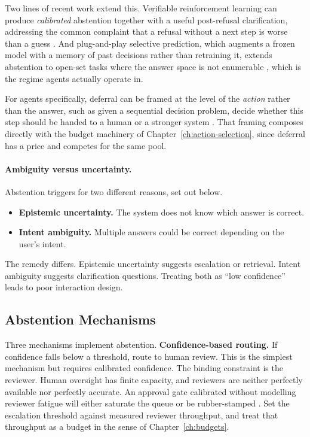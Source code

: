 Two lines of recent work extend this. Verifiable reinforcement learning can produce
\emph{calibrated} abstention together with a useful post-refusal clarification,
addressing the common complaint that a refusal without a next step is worse than a
guess \cite{abstainr12026}. And plug-and-play selective prediction, which augments
a frozen model with a memory of past decisions rather than retraining it, extends
abstention to open-set tasks where the answer space is not enumerable
\cite{selectivepred2026}, which is the regime agents actually operate in.

For agents specifically, deferral can be framed at the level of the \emph{action}
rather than the answer, such as given a sequential decision problem, decide whether this
step should be handed to a human or a stronger system \cite{redact2026}. That
framing composes directly with the budget machinery of
Chapter~\ref{ch:action-selection}, since deferral has a price and competes for the
same pool.

\paragraph{Ambiguity versus uncertainty.}
Abstention triggers for two different reasons, set out below.
\begin{itemize}
\item \textbf{Epistemic uncertainty.} The system does not know which answer is correct.
\item \textbf{Intent ambiguity.} Multiple answers could be correct depending on the user's intent.
\end{itemize}
The remedy differs. Epistemic uncertainty suggests escalation or retrieval. Intent ambiguity suggests clarification questions. Treating both as ``low confidence'' leads to poor interaction design.

\subsection{Abstention Mechanisms}

Three mechanisms implement abstention. \textbf{Confidence-based routing.} If confidence falls below a threshold, route to human review. This is the simplest mechanism but requires calibrated confidence. The binding constraint is the reviewer. Human oversight has finite capacity, and reviewers are neither perfectly available nor perfectly accurate. An approval gate calibrated without modelling reviewer fatigue will either saturate the queue or be rubber-stamped \cite{oversightcap2026}. Set the escalation threshold against measured reviewer throughput, and treat that throughput as a budget in the sense of Chapter~\ref{ch:budgets}.

